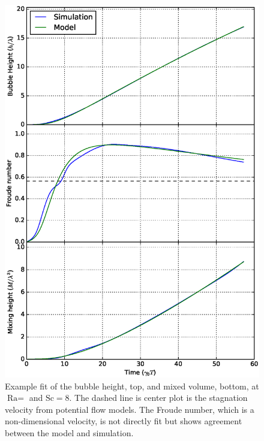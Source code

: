 \begin{figure}
\includegraphics[width=\columnwidth]{figs/H-8-1}
\caption{ 
  Example fit of the bubble height, top, and mixed volume, bottom, at $\text{Ra} = $ and $\text{Sc} = 8$.
  The dashed line is center plot is the stagnation velocity from potential flow models.
  The Froude number, which is a non-dimensional velocity, is not directly fit but shows agreement between the model and simulation.
}
\end{figure}

